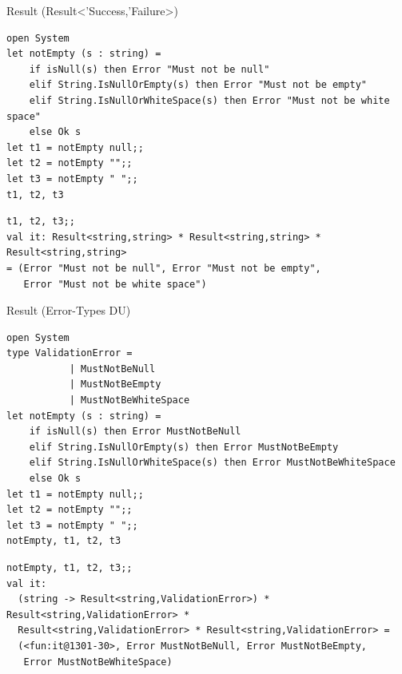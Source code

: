 \documentclass[t]{beamer}
\begin{document}
\begin{frame}[label={sec:org682859f},fragile]{Result (Result<'Success,'Failure>)}
 \begin{verbatim}
open System
let notEmpty (s : string) =
    if isNull(s) then Error "Must not be null"
    elif String.IsNullOrEmpty(s) then Error "Must not be empty"
    elif String.IsNullOrWhiteSpace(s) then Error "Must not be white space"
    else Ok s
let t1 = notEmpty null;;
let t2 = notEmpty "";;
let t3 = notEmpty " ";;
t1, t2, t3
\end{verbatim}

\begin{verbatim}
t1, t2, t3;;
val it: Result<string,string> * Result<string,string> * Result<string,string>
= (Error "Must not be null", Error "Must not be empty",
   Error "Must not be white space")
\end{verbatim}
\end{frame}

\begin{frame}[label={sec:orgc68937d},fragile]{Result (Error-Types DU)}
 \begin{verbatim}
open System
type ValidationError =
           | MustNotBeNull
           | MustNotBeEmpty
           | MustNotBeWhiteSpace
let notEmpty (s : string) =
    if isNull(s) then Error MustNotBeNull
    elif String.IsNullOrEmpty(s) then Error MustNotBeEmpty
    elif String.IsNullOrWhiteSpace(s) then Error MustNotBeWhiteSpace
    else Ok s
let t1 = notEmpty null;;
let t2 = notEmpty "";;
let t3 = notEmpty " ";;
notEmpty, t1, t2, t3
\end{verbatim}

\begin{verbatim}
notEmpty, t1, t2, t3;;
val it:
  (string -> Result<string,ValidationError>) * Result<string,ValidationError> *
  Result<string,ValidationError> * Result<string,ValidationError> =
  (<fun:it@1301-30>, Error MustNotBeNull, Error MustNotBeEmpty,
   Error MustNotBeWhiteSpace)
\end{verbatim}
\end{frame}
\end{document}
